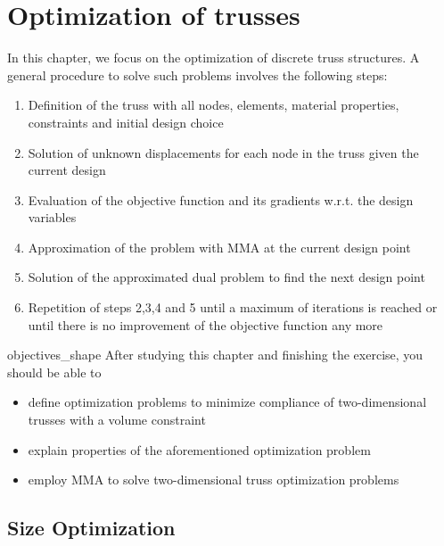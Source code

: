 \chapter{Optimization of trusses}
In this chapter, we focus on the optimization of discrete truss structures. A general procedure to solve such problems involves the following steps:
\begin{enumerate}
    \item Definition of the truss with all nodes, elements, material properties, constraints and initial design choice
    \item Solution of unknown displacements for each node in the truss given the current design
    \item Evaluation of the objective function and its gradients w.r.t. the design variables
    \item Approximation of the problem with MMA at the current design point
    \item Solution of the approximated dual problem to find the next design point
    \item Repetition of steps 2,3,4 and 5 until a maximum of iterations is reached or until there is no improvement of the objective function any more
\end{enumerate}


\begin{objectives}{}{objectives_shape}
After studying this chapter and finishing the exercise, you should be able to 
\begin{itemize}[label=$\dots$]
    \item define optimization problems to minimize compliance of two-dimensional trusses with a volume constraint
    \item explain properties of the aforementioned optimization problem
    \item employ MMA to solve two-dimensional truss optimization problems
\end{itemize}
\end{objectives}

\section{Size Optimization}

